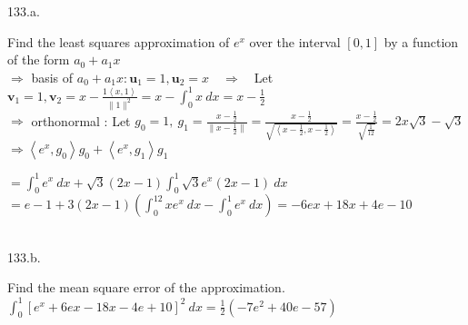 \documentclass[12pt]{book}
\begin{document}
\begin{CJK}{UTF8}{bsmi}
133.a. \begin{minipage}[t]{\dimexpr\linewidth}
Find the least squares approximation of $e^x$ over the interval $[0,1]$ by a function of the form $a_0+a_1x$ \\
$\Rightarrow$ basis of $a_0+a_1x : \textbf{u}_1=1,\textbf{u}_2=x\quad\Rightarrow\quad$Let $\displaystyle\textbf{v}_1=1,\textbf{v}_2=x-\frac{1\left\langle x, 1\right\rangle}{\parallel1\parallel^2}=x-\int_0^1x\ dx=x-\frac{1}{2}$ \\
$\Rightarrow$ orthonormal : Let $\displaystyle g_0=1,\  g_1=\frac{x-\frac{1}{2}}{\parallel x-\frac{1}{2}\parallel}=\frac{x-\frac{1}{2}}{\sqrt{\left\langle x-\frac{1}{2}, x-\frac{1}{2}\right\rangle}}=\frac{x-\frac{1}{2}}{\sqrt{\frac{1}{12}}}=2x\sqrt{3}-\sqrt{3}$ \\
$\Rightarrow\left\langle e^x, g_0\right\rangle g_0+\left\langle e^x, g_1\right\rangle g_1$ \begin{minipage}[t]{\dimexpr\linewidth}
$\displaystyle=\int_0^1e^x\ dx+\sqrt{3}(2x-1)\int_0^1\sqrt{3}e^x(2x-1)\ dx$ \\
$\displaystyle=e-1+3(2x-1)(\int_0^12xe^x\ dx-\int_0^1e^x\ dx)=-6ex+18x+4e-10$
\end{minipage}
\end{minipage}\\

133.b. \begin{minipage}[t]{\dimexpr\linewidth}
Find the mean square error of the approximation. \\
$\displaystyle\int_0^1[e^x+6ex-18x-4e+10]^2\ dx=\frac{1}{2}(-7e^2+40e-57)$
\end{minipage}\\


\end{CJK}
\end{document}
